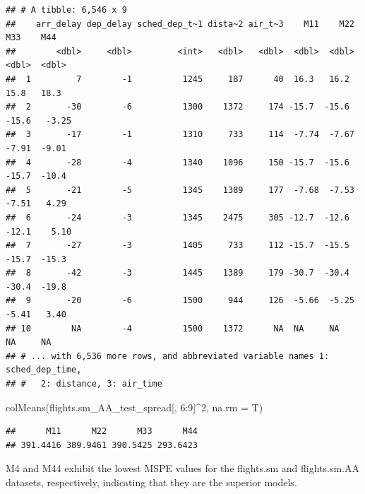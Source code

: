 \documentclass[
]{article}
\newenvironment{Shaded}{\begin{snugshade}}{\end{snugshade}}
\newcommand{\AttributeTok}[1]{\textcolor[rgb]{0.77,0.63,0.00}{#1}}
\newcommand{\DecValTok}[1]{\textcolor[rgb]{0.00,0.00,0.81}{#1}}
\newcommand{\FunctionTok}[1]{\textcolor[rgb]{0.00,0.00,0.00}{#1}}
\newcommand{\NormalTok}[1]{#1}
\newcommand{\SpecialCharTok}[1]{\textcolor[rgb]{0.00,0.00,0.00}{#1}}
\begin{document}
\begin{verbatim}
## # A tibble: 6,546 x 9
##    arr_delay dep_delay sched_dep_t~1 dista~2 air_t~3    M11    M22    M33    M44
##        <dbl>     <dbl>         <int>   <dbl>   <dbl>  <dbl>  <dbl>  <dbl>  <dbl>
##  1         7        -1          1245     187      40  16.3   16.2   15.8   18.3 
##  2       -30        -6          1300    1372     174 -15.7  -15.6  -15.6   -3.25
##  3       -17        -1          1310     733     114  -7.74  -7.67  -7.91  -9.01
##  4       -28        -4          1340    1096     150 -15.7  -15.6  -15.7  -10.4 
##  5       -21        -5          1345    1389     177  -7.68  -7.53  -7.51   4.29
##  6       -24        -3          1345    2475     305 -12.7  -12.6  -12.1    5.10
##  7       -27        -3          1405     733     112 -15.7  -15.5  -15.7  -15.3 
##  8       -42        -3          1445    1389     179 -30.7  -30.4  -30.4  -19.8 
##  9       -20        -6          1500     944     126  -5.66  -5.25  -5.41   3.40
## 10        NA        -4          1500    1372      NA  NA     NA     NA     NA   
## # ... with 6,536 more rows, and abbreviated variable names 1: sched_dep_time,
## #   2: distance, 3: air_time
\end{verbatim}

\begin{Shaded}
\begin{Highlighting}[]
\FunctionTok{colMeans}\NormalTok{(flights.sm\_AA\_test\_spread[, }\DecValTok{6}\SpecialCharTok{:}\DecValTok{9}\NormalTok{]}\SpecialCharTok{\^{}}\DecValTok{2}\NormalTok{, }\AttributeTok{na.rm =}\NormalTok{ T)}
\end{Highlighting}
\end{Shaded}

\begin{verbatim}
##      M11      M22      M33      M44 
## 391.4416 389.9461 390.5425 293.6423
\end{verbatim}

M4 and M44 exhibit the lowest MSPE values for the flights.sm and
flights.sm.AA datasets, respectively, indicating that they are the
superior models.
\end{document}
